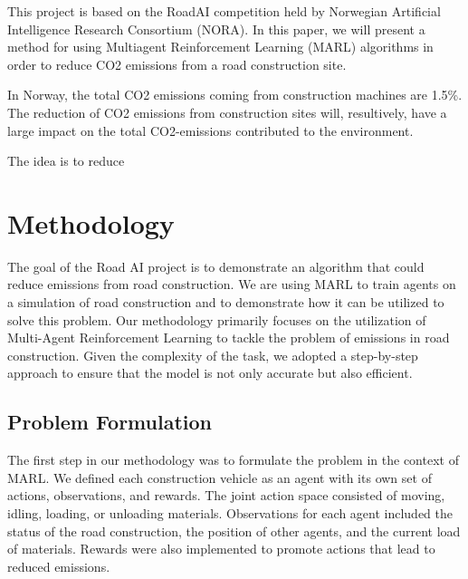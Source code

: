 \documentclass[conference]{IEEEtran}
\begin{document}
This project is based on the RoadAI competition held by Norwegian Artificial Intelligence Research
Consortium (NORA)\cite{noraRoadAIReducing}. In this paper, we will present a method for using Multiagent
Reinforcement Learning (MARL) algorithms in order to reduce CO2 emissions from a road construction site.

In Norway, the total CO2 emissions coming from construction machines are 1.5\%.\cite{noraRoadAIReducing}
The reduction of CO2 emissions from construction sites will, resultively, have a large impact on the
total CO2-emissions contributed to the environment.

The idea is to reduce 




\section{Methodology}

The goal of the Road AI project is to demonstrate an algorithm that could reduce emissions from road construction.
We are using MARL to train agents on a simulation of road construction and to demonstrate how it can be utilized to solve this problem.
Our methodology primarily focuses on the utilization of Multi-Agent Reinforcement Learning to tackle the problem of emissions in road construction. Given the complexity of the task, we adopted a step-by-step approach to ensure that the model is not only accurate but also efficient.

\subsection{Problem Formulation}
The first step in our methodology was to formulate the problem in the context of MARL. We defined each construction vehicle as an agent with its own set of actions, observations, and rewards. The joint action space consisted of moving, idling, loading, or unloading materials. Observations for each agent included the status of the road construction, the position of other agents, and the current load of materials. Rewards were also implemented to promote actions that lead to reduced emissions.
\end{document}
